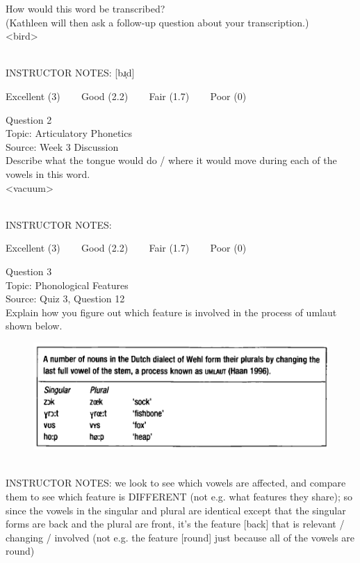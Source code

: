 \documentclass[12pt]{article}
\begin{document}
How would this word be transcribed?\\ (Kathleen will then ask a follow-up question about your transcription.)\\

<bird>


~\\
INSTRUCTOR NOTES: [bɹ̩d]


\vfill
Excellent (3) ~~~ Good (2.2) ~~~ Fair (1.7) ~~~ Poor (0)
\newpage

{\large Question 2}\\

Topic: Articulatory Phonetics\\
Source: Week 3 Discussion\\

Describe what the tongue would do / where it would move during each of the vowels in this word.\\

<vacuum>


~\\
INSTRUCTOR NOTES: 


\vfill
Excellent (3) ~~~ Good (2.2) ~~~ Fair (1.7) ~~~ Poor (0)
\newpage

{\large Question 3}\\

Topic: Phonological Features\\
Source: Quiz 3, Question 12\\

Explain how you figure out which feature is involved in the process of umlaut shown below.\\

\begin{figure}[H]
\includegraphics{../images/dutch.png}
\end{figure}

~\\
INSTRUCTOR NOTES: we look to see which vowels are affected, and compare them to see which feature is DIFFERENT (not e.g. what features they share); so since the vowels in the singular and plural are identical except that the singular forms are back and the plural are front, it's the feature [back] that is relevant / changing / involved (not e.g. the feature [round] just because all of the vowels are round)
\end{document}
